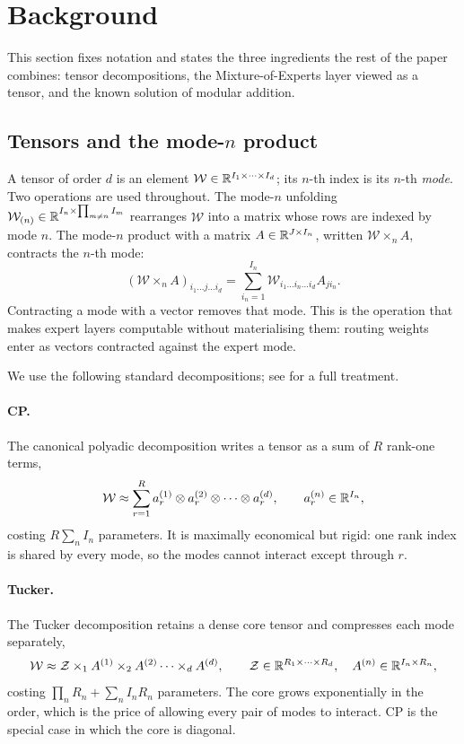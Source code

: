\section{Background}
\label{sec:background}

This section fixes notation and states the three ingredients the rest of the
paper combines: tensor decompositions, the Mixture-of-Experts layer viewed as
a tensor, and the known solution of modular addition.

\subsection{Tensors and the mode-$n$ product}

A tensor of order $d$ is an element $\mathcal{W} \in \mathbb{R}^{I_1 \times \cdots
\times I_d}$; its $n$-th index is its $n$-th \emph{mode}. Two operations are
used throughout. The mode-$n$ unfolding $\mathcal{W}_{(n)} \in \mathbb{R}^{I_n \times
\prod_{m \neq n} I_m}$ rearranges $\mathcal{W}$ into a matrix whose rows are
indexed by mode $n$. The mode-$n$ product with a matrix $A \in \mathbb{R}^{J \times
I_n}$, written $\mathcal{W} \times_n A$, contracts the $n$-th mode:
\begin{equation}
  (\mathcal{W} \times_n A)_{i_1 \ldots j \ldots i_d}
  = \sum_{i_n = 1}^{I_n} \mathcal{W}_{i_1 \ldots i_n \ldots i_d} A_{j i_n}.
\end{equation}
Contracting a mode with a vector removes that mode. This is the operation that
makes expert layers computable without materialising them: routing weights
enter as vectors contracted against the expert mode.

We use the following standard decompositions; see \citet{kolda2009tensor} for
a full treatment.

\paragraph{CP.} The canonical polyadic decomposition writes a tensor as a sum
of $R$ rank-one terms,
\begin{equation}
  \mathcal{W} \approx \sum_{r=1}^{R} a^{(1)}_r \otimes a^{(2)}_r \otimes
  \cdots \otimes a^{(d)}_r,
  \qquad a^{(n)}_r \in \mathbb{R}^{I_n},
\end{equation}
costing $R \sum_n I_n$ parameters. It is maximally economical but rigid: one
rank index is shared by every mode, so the modes cannot interact except
through $r$.

\paragraph{Tucker.} The Tucker decomposition retains a dense core tensor and
compresses each mode separately,
\begin{equation}
  \mathcal{W} \approx \mathcal{Z} \times_1 A^{(1)} \times_2 A^{(2)} \cdots
  \times_d A^{(d)},
  \qquad \mathcal{Z} \in \mathbb{R}^{R_1 \times \cdots \times R_d},
  \quad A^{(n)} \in \mathbb{R}^{I_n \times R_n},
\end{equation}
costing $\prod_n R_n + \sum_n I_n R_n$ parameters. The core grows
exponentially in the order, which is the price of allowing every pair of modes
to interact. CP is the special case in which the core is diagonal.

